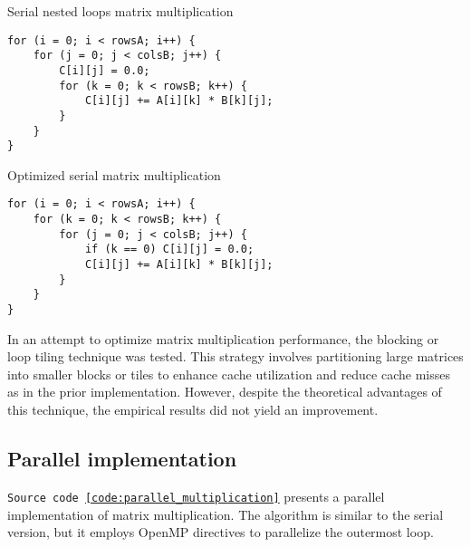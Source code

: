 \documentclass{article}
\begin{document}
\begin{multicols}{2}
    \begin{code}
        \caption{\label{code:serial_multiplication}Serial nested loops matrix multiplication}
        \begin{verbatim}
for (i = 0; i < rowsA; i++) {
    for (j = 0; j < colsB; j++) {
        C[i][j] = 0.0;
        for (k = 0; k < rowsB; k++) {
            C[i][j] += A[i][k] * B[k][j];
        }
    }
}
        \end{verbatim}
    \end{code}

    \columnbreak

    \begin{code}
        \caption{\label{code:serial_optimized_multiplication}Optimized serial matrix multiplication}
        \begin{verbatim}
for (i = 0; i < rowsA; i++) {
    for (k = 0; k < rowsB; k++) {
        for (j = 0; j < colsB; j++) {
            if (k == 0) C[i][j] = 0.0;
            C[i][j] += A[i][k] * B[k][j];
        }
    }
}
        \end{verbatim}
    \end{code}
\end{multicols}

In an attempt to optimize matrix multiplication performance, the blocking or loop tiling technique was tested. This strategy involves partitioning large matrices into smaller blocks or tiles to enhance cache utilization and reduce cache misses as in the prior implementation.
However, despite the theoretical advantages of this technique, the empirical results did not yield an improvement.

\subsection*{Parallel implementation}
\texttt{Source code~\ref{code:parallel_multiplication}} presents a parallel implementation of matrix multiplication. The algorithm is similar to the serial version, but it employs OpenMP directives to parallelize the outermost loop.
\end{document}
